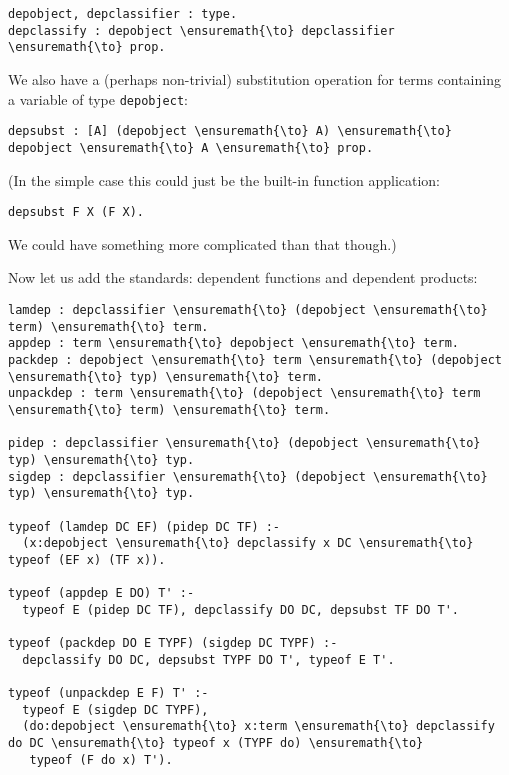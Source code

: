 \begin{verbatim}
depobject, depclassifier : type.
depclassify : depobject \ensuremath{\to} depclassifier \ensuremath{\to} prop.
\end{verbatim}

We also have a (perhaps non-trivial) substitution operation for terms
containing a variable of type \texttt{depobject}:

\begin{verbatim}
depsubst : [A] (depobject \ensuremath{\to} A) \ensuremath{\to} depobject \ensuremath{\to} A \ensuremath{\to} prop.
\end{verbatim}

(In the simple case this could just be the built-in function
application:

\begin{verbatim}
depsubst F X (F X).
\end{verbatim}

We could have something more complicated than that though.)

Now let us add the standards: dependent functions and dependent
products:

\begin{verbatim}
lamdep : depclassifier \ensuremath{\to} (depobject \ensuremath{\to} term) \ensuremath{\to} term.
appdep : term \ensuremath{\to} depobject \ensuremath{\to} term.
packdep : depobject \ensuremath{\to} term \ensuremath{\to} (depobject \ensuremath{\to} typ) \ensuremath{\to} term.
unpackdep : term \ensuremath{\to} (depobject \ensuremath{\to} term \ensuremath{\to} term) \ensuremath{\to} term.

pidep : depclassifier \ensuremath{\to} (depobject \ensuremath{\to} typ) \ensuremath{\to} typ.
sigdep : depclassifier \ensuremath{\to} (depobject \ensuremath{\to} typ) \ensuremath{\to} typ.

typeof (lamdep DC EF) (pidep DC TF) :-
  (x:depobject \ensuremath{\to} depclassify x DC \ensuremath{\to} typeof (EF x) (TF x)).

typeof (appdep E DO) T' :-
  typeof E (pidep DC TF), depclassify DO DC, depsubst TF DO T'.

typeof (packdep DO E TYPF) (sigdep DC TYPF) :-
  depclassify DO DC, depsubst TYPF DO T', typeof E T'.

typeof (unpackdep E F) T' :-
  typeof E (sigdep DC TYPF),
  (do:depobject \ensuremath{\to} x:term \ensuremath{\to} depclassify do DC \ensuremath{\to} typeof x (TYPF do) \ensuremath{\to}
   typeof (F do x) T').
\end{verbatim}

